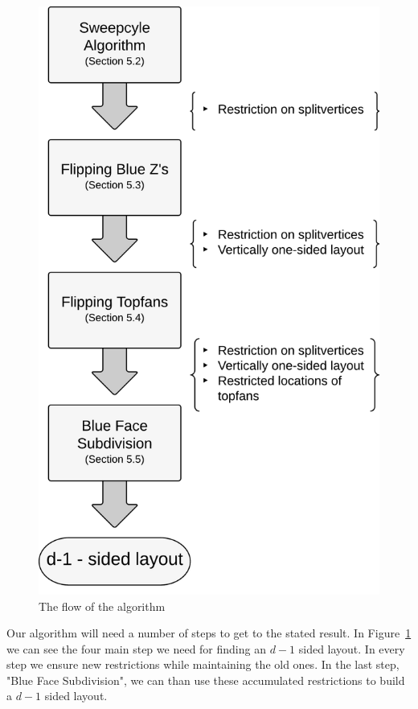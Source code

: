   \begin{figure}
    \hfill
    \includegraphics[scale=.37]{unifiedAlgo/img/algoflowext2.pdf}
    \caption{The flow of the algorithm}
    \label{fig:algo:algoflow}
  \end{figure}

  Our algorithm will need a number of steps to get to the stated result. In Figure~\ref{fig:algo:algoflow} we can see the four main step we need for finding an $d-1$ sided layout. In every step we ensure new restrictions while maintaining the old ones. In the last step, "Blue Face Subdivision", we can than use these accumulated restrictions to build a $d-1$ sided layout.

